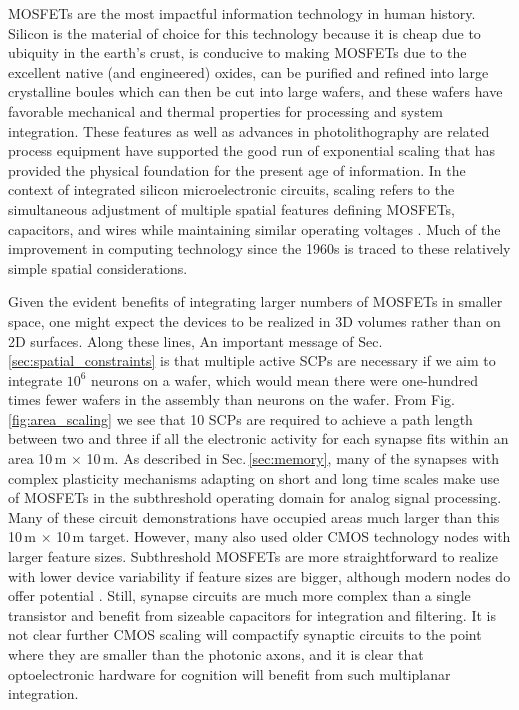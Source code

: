 \documentclass[twocolumn]{article}
\begin{document}
MOSFETs are the most impactful information technology in human history. Silicon is the material of choice for this technology because it is cheap due to ubiquity in the earth's crust, is conducive to making MOSFETs due to the excellent native (and engineered) oxides, can be purified and refined into large crystalline boules which can then be cut into large wafers, and these wafers have favorable mechanical and thermal properties for processing and system integration. These features as well as advances in photolithography are related process equipment have supported the good run of exponential scaling \cite{} that has provided the physical foundation for the present age of information. In the context of integrated silicon microelectronic circuits, scaling refers to the simultaneous adjustment of multiple spatial features defining MOSFETs, capacitors, and wires while maintaining similar operating voltages \cite{Keyes}. Much of the improvement in computing technology since the 1960s is traced to these relatively simple spatial considerations. 

Given the evident benefits of integrating larger numbers of MOSFETs in smaller space, one might expect the devices to be realized in 3D volumes rather than on 2D surfaces. Along these lines, An important message of Sec.\,\ref{sec:spatial_constraints} is that multiple active SCPs are necessary if we aim to integrate $10^6$ neurons on a wafer, which would mean there were one-hundred times fewer wafers in the assembly than neurons on the wafer. From Fig.\,\ref{fig:area_scaling} we see that 10 SCPs are required to achieve a path length between two and three if all the electronic activity for each synapse fits within an area 10\,\textmu m $\times$ 10\,\textmu m. As described in Sec.\,\ref{sec:memory}, many of the synapses with complex plasticity mechanisms adapting on short and long time scales make use of MOSFETs in the subthreshold operating domain for analog signal processing. Many of these circuit demonstrations have occupied areas much larger than this 10\,\textmu m $\times$ 10\,\textmu m target. However, many also used older CMOS technology nodes with larger feature sizes. Subthreshold MOSFETs are more straightforward to realize with lower device variability if feature sizes are bigger, although modern nodes do offer potential \cite{}. Still, synapse circuits are much more complex than a single transistor and benefit from sizeable capacitors for integration and filtering. It is not clear further CMOS scaling will compactify synaptic circuits to the point where they are smaller than the photonic axons, and it is clear that optoelectronic hardware for cognition will benefit from such multiplanar integration.
\end{document}
